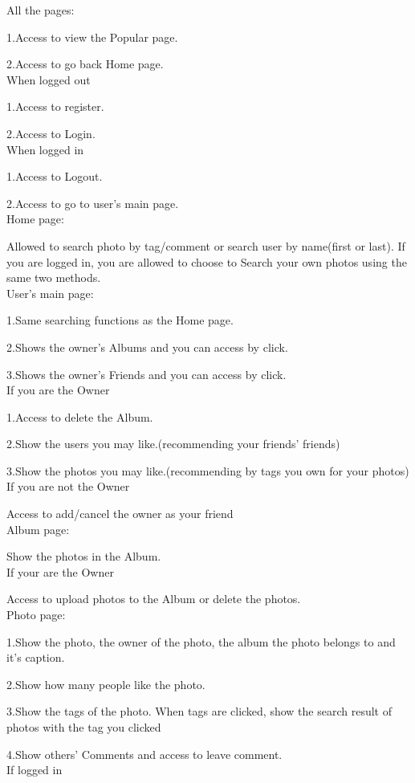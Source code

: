 \documentclass[11pt, oneside]{article}   	%
\begin{document}
All the pages:\\[0.3cm]
\par1.Access to view the Popular page.\par
2.Access to go back Home page.\\[0.1cm]
When logged out
\par1.Access to register.\par
2.Access to Login.\\[0.1cm]
When logged in
\par1.Access to Logout.\par
2.Access to go to user's main page.\\[0.3cm]
Home page:
\par Allowed to search photo by tag/comment or search user by name(first or last). If you are logged in, you are allowed to choose to Search your own photos using the same two methods.\\[0.3cm]
User's main page:\par
1.Same searching functions as the Home page.\par
2.Shows the owner's Albums and you can access by click.\par
3.Shows the owner's Friends and you can access by click.\\[0.1cm]
If you are the Owner\par
1.Access to delete the Album.\par
2.Show the users you may like.(recommending your friends' friends)\par
3.Show the photos you may like.(recommending by tags you own for your photos)\\[0.1cm]
If you are not the Owner\par
Access to add/cancel the owner as your friend\\[0.3cm]
Album page:\par
Show the photos in the Album.\\[0.1cm]
If your are the Owner\par
Access to upload photos to the Album or delete the photos.\\[0.3cm]
Photo page:\par
1.Show the photo, the owner of the photo, the album the photo belongs to and it's caption.\par
2.Show how many people like the photo.\par
3.Show the tags of the photo. When tags are clicked, show the search result of photos with the tag you clicked\par
4.Show others' Comments and access to leave comment.\\[0.1cm]
If logged in\par
\end{document}
